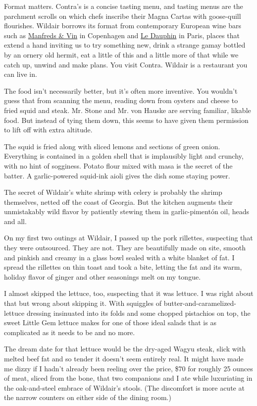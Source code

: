 Format matters. Contra's is a concise tasting menu, and tasting menus
are the parchment scrolls on which chefs inscribe their Magna Cartas
with goose-quill flourishes. Wildair borrows its format from
contemporary European wine bars such as
\href{http://manfreds.dk/en/}{Manfreds \& Vin} in Copenhagen and
\href{http://www.restaurantledauphin.net/}{Le Dauphin} in Paris, places
that extend a hand inviting us to try something new, drink a strange
gamay bottled by an ornery old hermit, eat a little of this and a little
more of that while we catch up, unwind and make plans. You visit Contra.
Wildair is a restaurant you can live in.

The food isn't necessarily better, but it's often more inventive. You
wouldn't guess that from scanning the menu, reading down from oysters
and cheese to fried squid and steak. Mr. Stone and Mr. von Hauske are
serving familiar, likable food. But instead of tying them down, this
seems to have given them permission to lift off with extra altitude.

The squid is fried along with sliced lemons and sections of green onion.
Everything is contained in a golden shell that is implausibly light and
crunchy, with no hint of sogginess. Potato flour mixed with masa is the
secret of the batter. A garlic-powered squid-ink aioli gives the dish
some staying power.

The secret of Wildair's white shrimp with celery is probably the shrimp
themselves, netted off the coast of Georgia. But the kitchen augments
their unmistakably wild flavor by patiently stewing them in
garlic-pimentón oil, heads and all.

On my first two outings at Wildair, I passed up the pork rillettes,
suspecting that they were outsourced. They are not. They are beautifully
made on site, smooth and pinkish and creamy in a glass bowl sealed with
a white blanket of fat. I spread the rillettes on thin toast and took a
bite, letting the fat and its warm, holiday flavor of ginger and other
seasonings melt on my tongue.

I almost skipped the lettuce, too, suspecting that it was lettuce. I was
right about that but wrong about skipping it. With squiggles of
butter-and-caramelized-lettuce dressing insinuated into its folds and
some chopped pistachios on top, the sweet Little Gem lettuce makes for
one of those ideal salads that is as complicated as it needs to be and
no more.

The dream date for that lettuce would be the dry-aged Wagyu steak, slick
with melted beef fat and so tender it doesn't seem entirely real. It
might have made me dizzy if I hadn't already been reeling over the
price, \$70 for roughly 25 ounces of meat, sliced from the bone, that
two companions and I ate while luxuriating in the oak-and-steel embrace
of Wildair's stools. (The discomfort is more acute at the narrow
counters on either side of the dining room.)

